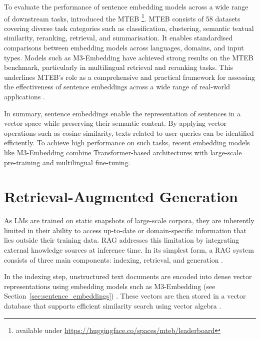 \documentclass[a4paper,oneside,bibliography=totoc]{scrbook}
\begin{document}
To evaluate the performance of sentence embedding models across a wide range of downstream tasks, \citet{Muennighoff2023} introduced the \ac{MTEB} \footnote{available under \url{https://huggingface.co/spaces/mteb/leaderboard}}. \ac{MTEB} consists of 58 datasets covering diverse task categories such as classification, clustering, semantic textual similarity, reranking, retrieval, and summarisation. It enables standardised comparisons between embedding models across languages, domains, and input types. Models such as M3-Embedding have achieved strong results on the \ac{MTEB} benchmark, particularly in multilingual retrieval and reranking tasks. This underlines \ac{MTEB}'s role as a comprehensive and practical framework for assessing the effectiveness of sentence embeddings across a wide range of real-world applications \cite{Muennighoff2023}.

In summary, sentence embeddings enable the representation of sentences in a vector space while preserving their semantic content. By applying vector operations such as cosine similarity, texts related to user queries can be identified efficiently. To achieve high performance on such tasks, recent embedding models like M3-Embedding combine Transformer-based architectures with large-scale pre-training and multilingual fine-tuning.


\section{Retrieval-Augmented Generation}
\label{sec:retrieval_augmented_generation}

As \acp{LM} are trained on static snapshots of large-scale corpora, they are inherently limited in their ability to access up-to-date or domain-specific information that lies outside their training data. \Ac{RAG} addresses this limitation by integrating external knowledge sources at inference time. In its simplest form, a \ac{RAG} system consists of three main components: indexing, retrieval, and generation \cite{Gao2024}.

In the indexing step, unstructured text documents are encoded into dense vector representations using embedding models such as M3-Embedding (see Section~\ref{sec:sentence_embeddings}) \cite{Gao2024}. These vectors are then stored in a vector database that supports efficient similarity search using vector algebra \cite{Gao2024,Pan2024}.
\end{document}
